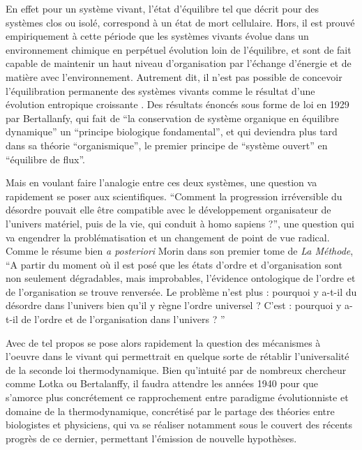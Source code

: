 En effet pour un système vivant, l'état d'équilibre tel que décrit pour des systèmes clos ou isolé, correspond à un état de mort cellulaire. Hors, il est prouvé empiriquement à cette période que les systèmes vivants évolue dans un environnement chimique en perpétuel évolution loin de l'équilibre, et sont de fait capable de maintenir un haut niveau d'organisation par l'échange d'énergie et de matière avec l'environnement. Autrement dit, il n'est pas possible de concevoir l'équilibration permanente des systèmes vivants comme le résultat d'une évolution entropique croissante \autocite[248]{Lemoigne1977}. Des résultats énoncés sous forme de loi en 1929 par Bertallanfy, qui fait de \enquote{la conservation de système organique en équilibre dynamique} un \enquote{principe biologique fondamental}, et qui deviendra plus tard dans sa théorie \enquote{organismique}, le premier principe de  \enquote{système ouvert} en \enquote{équilibre de flux}. \autocite[492]{Pouvreau2013}

Mais en voulant faire l'analogie entre ces deux systèmes, une question va rapidement se poser aux scientifiques. \enquote{Comment la progression irréversible du désordre pouvait elle être compatible avec le développement organisateur de l'univers matériel, puis de la vie, qui conduit à homo sapiens ?}, une question qui va engendrer la problématisation et un changement de point de vue radical. Comme le résume bien \textit{a posteriori} Morin dans son premier tome de \textit{La Méthode}, \enquote{A partir du moment où il est posé que les états d'ordre et d'organisation sont non seulement dégradables, mais improbables, l'évidence ontologique de l'ordre et de l'organisation se trouve renversée. Le problème n'est plus : pourquoi y a-t-il du désordre dans l'univers bien qu'il y règne l'ordre universel ? C'est : pourquoi y a-t-il de l'ordre et de l'organisation dans l'univers ? } \autocite[37]{Morin1977}

Avec de tel propos se pose alors rapidement la question des mécanismes à l'oeuvre dans le vivant qui permettrait en quelque sorte de rétablir l'universalité de la seconde loi thermodynamique. Bien qu'intuité par de nombreux chercheur comme Lotka ou Bertalanffy, il faudra attendre les années 1940 pour que s'amorce plus concrétement ce rapprochement entre paradigme évolutionniste et domaine de la thermodynamique, concrétisé par le partage des théories entre biologistes et physiciens, qui va se réaliser notamment sous le couvert des récents progrès de ce dernier, permettant l'émission de nouvelle hypothèses.

